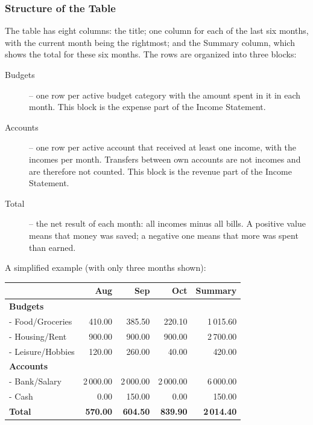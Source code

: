 

\subsubsection{Structure of the Table}

The table has eight columns: the title; one column for each of the last six months, with the
current month being the rightmost; and the Summary column, which shows the total for these
six months. The rows are organized into three blocks:

\begin{description}
  \item[Budgets] -- one row per active budget category with the amount spent in it in each
  month. This block is the expense part of the Income Statement.
  \item[Accounts] -- one row per active account that received at least one income, with the
  incomes per month. Transfers between own accounts are not incomes and are therefore not
  counted. This block is the revenue part of the Income Statement.
  \item[Total] -- the net result of each month: all incomes minus all bills. A positive value
  means that money was saved; a negative one means that more was spent than earned.
\end{description}

\noindent A simplified example (with only three months shown):

\begin{center}
\footnotesize
\setlength{\tabcolsep}{4pt}
\begin{tabular}{|l|r|r|r|r|}
  \hline
   & \textbf{Aug} & \textbf{Sep} & \textbf{Oct} & \textbf{Summary} \\
  \hline
  \textbf{Budgets} & & & & \\
  - Food/Groceries & 410.00 & 385.50 & 220.10 & 1\,015.60 \\
  - Housing/Rent & 900.00 & 900.00 & 900.00 & 2\,700.00 \\
  - Leisure/Hobbies & 120.00 & 260.00 & 40.00 & 420.00 \\
  \textbf{Accounts} & & & & \\
  - Bank/Salary & 2\,000.00 & 2\,000.00 & 2\,000.00 & 6\,000.00 \\
  - Cash & 0.00 & 150.00 & 0.00 & 150.00 \\
  \hline
  \textbf{Total} & \textbf{570.00} & \textbf{604.50} & \textbf{839.90} & \textbf{2\,014.40} \\
  \hline
\end{tabular}
\end{center}

